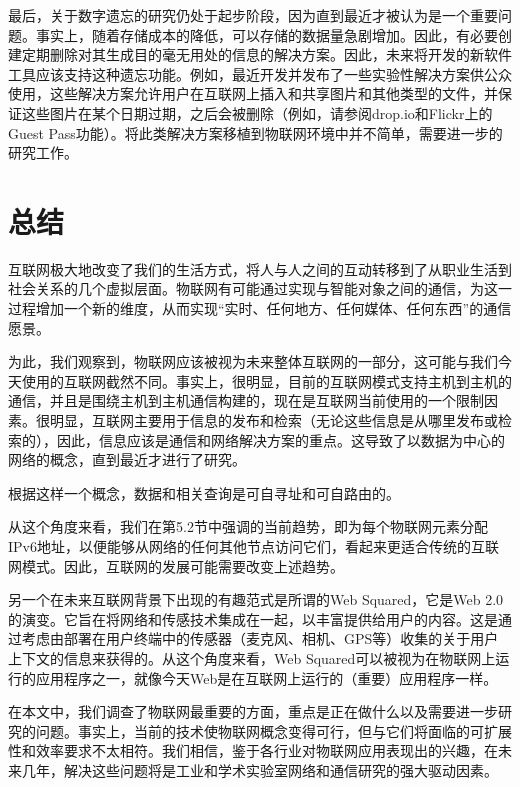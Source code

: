\documentclass[12pt,a4paper]{article}%
\begin{document}
最后，关于数字遗忘的研究仍处于起步阶段，因为直到最近才被认为是一个重要问题。事实上，随着存储成本的降低，可以存储的数据量急剧增加。因此，有必要创建定期删除对其生成目的毫无用处的信息的解决方案。因此，未来将开发的新软件工具应该支持这种遗忘功能。例如，最近开发并发布了一些实验性解决方案供公众使用，这些解决方案允许用户在互联网上插入和共享图片和其他类型的文件，并保证这些图片在某个日期过期，之后会被删除（例如，请参阅drop.io和Flickr上的Guest Pass功能）。将此类解决方案移植到物联网环境中并不简单，需要进一步的研究工作。
\section{总结}
互联网极大地改变了我们的生活方式，将人与人之间的互动转移到了从职业生活到社会关系的几个虚拟层面。物联网有可能通过实现与智能对象之间的通信，为这一过程增加一个新的维度，从而实现“实时、任何地方、任何媒体、任何东西”的通信愿景。

为此，我们观察到，物联网应该被视为未来整体互联网的一部分，这可能与我们今天使用的互联网截然不同。事实上，很明显，目前的互联网模式支持主机到主机的通信，并且是围绕主机到主机通信构建的，现在是互联网当前使用的一个限制因素。很明显，互联网主要用于信息的发布和检索（无论这些信息是从哪里发布或检索的），因此，信息应该是通信和网络解决方案的重点。这导致了以数据为中心的网络的概念，直到最近才进行了研究。

根据这样一个概念，数据和相关查询是可自寻址和可自路由的。

从这个角度来看，我们在第5.2节中强调的当前趋势，即为每个物联网元素分配IPv6地址，以便能够从网络的任何其他节点访问它们，看起来更适合传统的互联网模式。因此，互联网的发展可能需要改变上述趋势。

另一个在未来互联网背景下出现的有趣范式是所谓的Web Squared，它是Web 2.0的演变。它旨在将网络和传感技术集成在一起，以丰富提供给用户的内容。这是通过考虑由部署在用户终端中的传感器（麦克风、相机、GPS等）收集的关于用户上下文的信息来获得的。从这个角度来看，Web Squared可以被视为在物联网上运行的应用程序之一，就像今天Web是在互联网上运行的（重要）应用程序一样。

在本文中，我们调查了物联网最重要的方面，重点是正在做什么以及需要进一步研究的问题。事实上，当前的技术使物联网概念变得可行，但与它们将面临的可扩展性和效率要求不太相符。我们相信，鉴于各行业对物联网应用表现出的兴趣，在未来几年，解决这些问题将是工业和学术实验室网络和通信研究的强大驱动因素。
\end{document}
